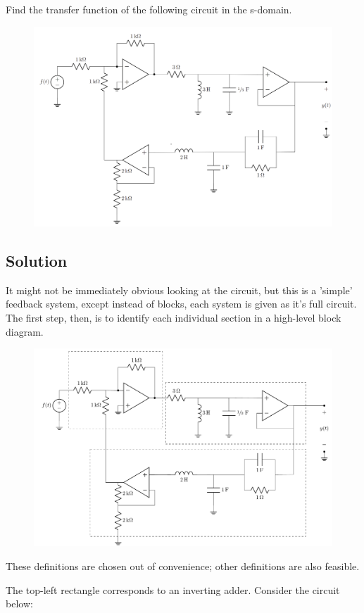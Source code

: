 \documentclass{article}
\begin{document}
Find the transfer function of the following circuit in the s-domain. 

\begin{figure}[ht!]
\centering
\includegraphics[width=0.75\linewidth]{figures/mega.png}
\end{figure}

\subsection{Solution}

It might not be immediately obvious looking at the circuit, but this is a 'simple' feedback system, except instead of blocks, each system is given as it's full circuit. The first step, then, is to identify each individual section in a high-level block diagram.

\begin{figure}[ht!]
\centering
\includegraphics[width=0.75\linewidth]{figures/megabreak.png}
\end{figure}

These definitions are chosen out of convenience; other definitions are also feasible.

The top-left rectangle corresponds to an inverting adder. Consider the circuit below:
\end{document}
